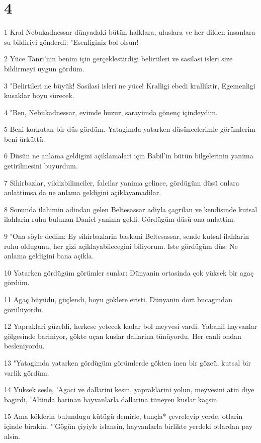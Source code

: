 \chapter{4}

\par 1 Kral Nebukadnessar dünyadaki bütün halklara, uluslara ve her dilden insanlara su bildiriyi gönderdi: "Esenliginiz bol olsun!
\par 2 Yüce Tanri'nin benim için gerçeklestirdigi belirtileri ve sasilasi isleri size bildirmeyi uygun gördüm.
\par 3 "Belirtileri ne büyük! Sasilasi isleri ne yüce! Kralligi ebedi kralliktir, Egemenligi kusaklar boyu sürecek.
\par 4 "Ben, Nebukadnessar, evimde huzur, sarayimda gönenç içindeydim.
\par 5 Beni korkutan bir düs gördüm. Yatagimda yatarken düsüncelerimle görümlerim beni ürküttü.
\par 6 Düsün ne anlama geldigini açiklamalari için Babil'in bütün bilgelerinin yanima getirilmesini buyurdum.
\par 7 Sihirbazlar, yildizbilimciler, falcilar yanima gelince, gördügüm düsü onlara anlattimsa da ne anlama geldigini açiklayamadilar.
\par 8 Sonunda ilahimin adindan gelen Beltesassar adiyla çagrilan ve kendisinde kutsal ilahlarin ruhu bulunan Daniel yanima geldi. Gördügüm düsü ona anlattim.
\par 9 "Ona söyle dedim: Ey sihirbazlarin baskani Beltesassar, sende kutsal ilahlarin ruhu oldugunu, her gizi açiklayabilecegini biliyorum. Iste gördügüm düs: Ne anlama geldigini bana açikla.
\par 10 Yatarken gördügüm görümler sunlar: Dünyanin ortasinda çok yüksek bir agaç gördüm.
\par 11 Agaç büyüdü, güçlendi, boyu göklere eristi. Dünyanin dört bucagindan görülüyordu.
\par 12 Yapraklari güzeldi, herkese yetecek kadar bol meyvesi vardi. Yabanil hayvanlar gölgesinde bariniyor, gökte uçan kuslar dallarina tünüyordu. Her canli ondan besleniyordu.
\par 13 "Yatagimda yatarken gördügüm görümlerde gökten inen bir gözcü, kutsal bir varlik gördüm.
\par 14 Yüksek sesle, 'Agaci ve dallarini kesin, yapraklarini yolun, meyvesini atin diye bagirdi, 'Altinda barinan hayvanlarla dallarina tüneyen kuslar kaçsin.
\par 15 Ama köklerin bulundugu kütügü demirle, tunçla* çevreleyip yerde, otlarin içinde birakin. "'Gögün çiyiyle islansin, hayvanlarla birlikte yerdeki otlardan pay alsin.
